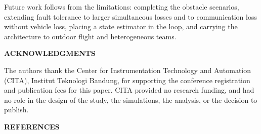 \documentclass[10pt,letterpaper]{article}
\newcommand{\headingone}[1]{%
    \par\vspace{9pt}%
    {\centering\fontsize{12}{14}\selectfont\bfseries\MakeUppercase{#1}\par}%
    \vspace{4pt}\noindent\ignorespaces}
\begin{document}
Future work follows from the limitations: completing the obstacle scenarios, extending
fault tolerance to larger simultaneous losses and to communication loss without vehicle
loss, placing a state estimator in the loop, and carrying the architecture to outdoor flight
and heterogeneous teams.

\headingone{Acknowledgments}

The authors thank the Center for Instrumentation Technology and Automation (CITA),
Institut Teknologi Bandung, for supporting the conference registration and publication
fees for this paper. CITA provided no research funding, and had no role in the design of
the study, the simulations, the analysis, or the decision to publish.

\headingone{References}

\begingroup
\setlength{\parindent}{0pt}
\renewcommand{\bibsection}{}     %


\endgroup
\end{document}
